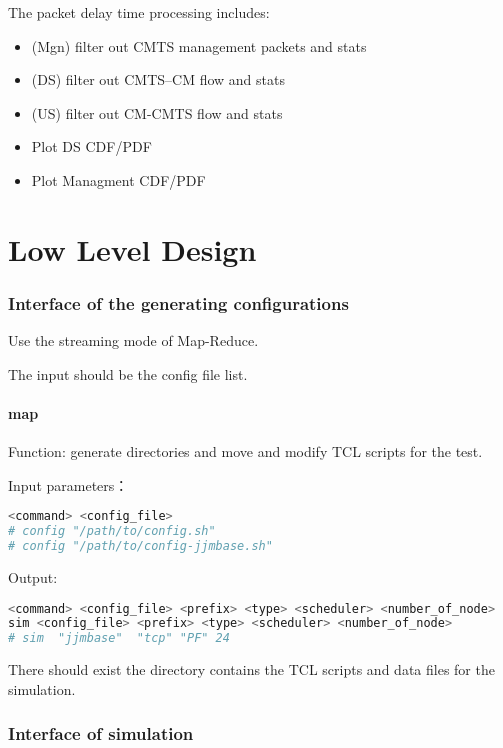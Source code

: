 The packet delay time processing includes:
\begin{itemize}
  \item (Mgn) filter out CMTS management packets and stats
  \item (DS) filter out CMTS--CM flow and stats
  \item (US) filter out CM-CMTS flow and stats
  \item Plot DS CDF/PDF
  \item Plot Managment CDF/PDF
\end{itemize}


\chapter{Low Level Design}


\subsection{Interface of the generating configurations}

Use the streaming mode of Map-Reduce.

The input should be the config file list.


\subsubsection{map}
Function: generate directories and move and modify TCL scripts for the test.


Input parameters：
\begin{lstlisting}[language=bash]
<command> <config_file>
# config "/path/to/config.sh"
# config "/path/to/config-jjmbase.sh"
\end{lstlisting}


Output:
\begin{lstlisting}[language=bash]
<command> <config_file> <prefix> <type> <scheduler> <number_of_node>
sim <config_file> <prefix> <type> <scheduler> <number_of_node>
# sim  "jjmbase"  "tcp" "PF" 24
\end{lstlisting}

There should exist the directory contains the TCL scripts and data files for the simulation.





\subsection{Interface of simulation}

